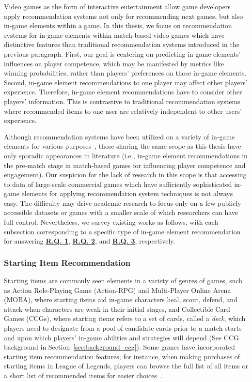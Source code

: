 Video games as the form of interactive entertainment allow game developers apply recommendation systems not only for recommending next games, but also in-game elements within a game. In this thesis, we focus on recommendation systems for in-game elements within match-based video games which have distinctive features than traditional recommendation systems introduced in the previous paragraph. First, our goal is centering on predicting in-game elements' influences on player competence, which may be manifested by metrics like winning probabilities, rather than players' preferences on those in-game elements. Second, in-game element recommendations to one player may affect other players' experience. Therefore, in-game element recommendations have to consider other players' information. This is contrastive to traditional recommendation systems where recommended items to one user are relatively independent to other users' experience.

Although recommendation systems have been utilized on a variety of in-game elements for various purposes~\cite{kolen2018horizontal,wu2017recommendation}, those sharing the same scope as this thesis have only sporadic appearances in literature (i.e., in-game element recommendations in the pre-match stage in match-based games for influencing player competence and engagement). 
Our suspicion for the lack of research in this scope is that accessing to data of large-scale commercial games which have sufficiently sophisticated in-game elements for applying recommendation system techniques is not always easy. The difficulty may drive academic research to focus only on a few publicly accessible datasets or games with a smaller scale of which researchers can have full control. Nevertheless, we survey existing works as follows, with each subsection corresponding to a specific type of in-game element recommendation for answering  \hyperref[rq1]{\textbf{R.Q. 1}},  \hyperref[rq2]{\textbf{R.Q. 2}}, and  \hyperref[rq3]{\textbf{R.Q. 3}}, respectively.


\subsubsection{Starting Item Recommendation}\label{sec:rw_startitem}
Starting items are commonly seen elements in a variety of genres of games, such as Action Role-Playing Game (Action-RPG) and Multi-Player Online Arena (MOBA), where starting items aid in-game characters heal, scout, defend, and attack when characters are weak in their initial stages, and Collectible Card Games (CCGs), where starting items refers to a set of cards, called a \textit{deck}, which players need to designate from a pool of candidate cards prior to a match starts and upon which players' in-game abilities and strategies will depend (See CCG background in  Section~\ref{sec:background_ccg}). Some games have incorporated starting item recommendation features; for instance, when making purchases of starting items in League of Legends, players can browse the full list of all items or a short list of recommended items for easier choices~\cite{lol_recomitem}. 

